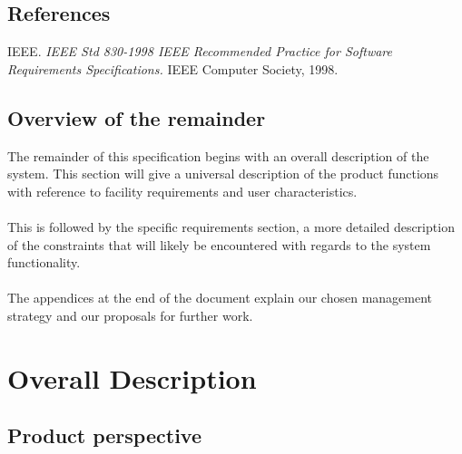 \documentclass[12p, a4paper, onecolumn]{report}
\begin{document}
\section{References}

IEEE. \emph{IEEE Std 830-1998 IEEE Recommended Practice for Software Requirements Specifications.} IEEE Computer Society, 1998.

\section{Overview of the remainder}

The remainder of this specification begins with an overall description of the system. This section will give a universal description of the product functions with reference to facility requirements and user characteristics. \\ \\
This is followed by the specific requirements section, a more detailed description of the constraints that will likely be encountered with regards to the system functionality. \\ \\
The appendices at the end of the document explain our chosen management strategy and our proposals for further work.

\chapter{Overall Description}

\section{Product perspective}
\end{document}
